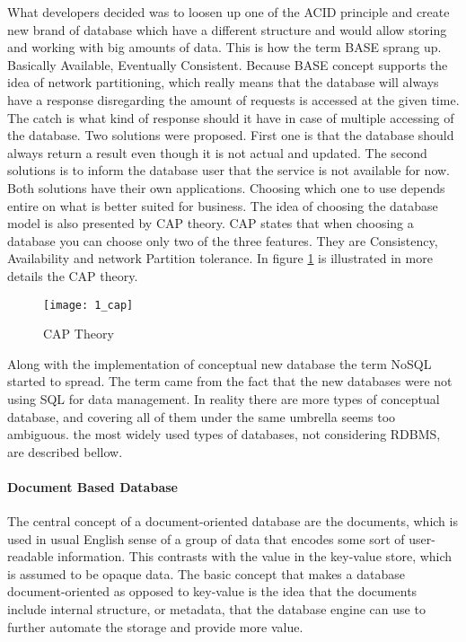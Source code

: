 What developers decided was to loosen up one of the ACID principle and create new brand of database which have a different structure and would allow storing and working with big amounts of data. This is how the term BASE sprang up. Basically Available, Eventually Consistent. Because BASE concept supports the idea of network partitioning, which really means that the database will always have a response disregarding the amount of requests is accessed at the given time. The catch is what kind of response should it have in case of multiple accessing of the database. Two solutions were proposed. First one is that the database should always return a result even though it is not actual and updated. The second solutions is to inform the database user that the service is not available for now. Both solutions have their own applications. Choosing which one to use depends entire on what is better suited for business. The idea of choosing the database model is also presented by CAP theory. CAP states that when choosing a database you can choose only two of the three features. They are Consistency, Availability and network Partition tolerance. In figure \ref{cap} is illustrated in more details the CAP theory.

\begin{figure}[!ht]
\centering
\texttt{[image: 1\_cap]}
\caption{CAP Theory}\label{cap}
\end{figure}

Along with the implementation of conceptual new database the term NoSQL started to spread. The term came from the fact that the new databases were not using SQL for data management. In reality there are more types of conceptual database, and covering all of them under the same umbrella seems too ambiguous.
the most widely used types of databases, not considering RDBMS, are described bellow.

\paragraph{Document Based Database}
The central concept of a document-oriented database are the documents, which is used in usual English sense of a group of data that encodes some sort of user-readable information. This contrasts with the value in the key-value store, which is assumed to be opaque data. The basic concept that makes a database document-oriented as opposed to key-value is the idea that the documents include internal structure, or metadata, that the database engine can use to further automate the storage and provide more value.

